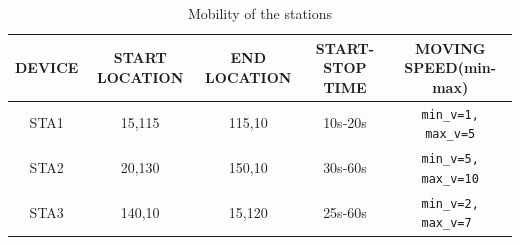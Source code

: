 \documentclass{article}
\begin{document}
    	\begin{table}[h]
        		\centering
       		\begin{tabular}{|c|c|c|c|c|}
        			\hline
        			DEVICE & START LOCATION & END LOCATION & START-STOP TIME & MOVING SPEED(min-max)  \\
        			\hline
        			STA1 & 15,115 & 115,10 & 10s-20s & \texttt{min\_v=1, max\_v=5} \\
        			STA2 & 20,130 & 150,10 & 30s-60s & \texttt{min\_v=5, max\_v=10} \\
        			STA3 & 140,10 & 15,120 & 25s-60s & \texttt{min\_v=2, max\_v=7 }\\
        			\hline
        		\end{tabular}
        \caption{Mobility of the stations}
        \label{tab:2}
    	\end{table}
\end{document}

